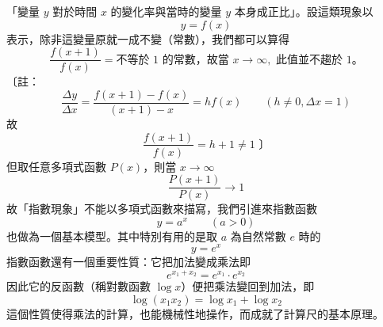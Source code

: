 「變量 $y$ 對於時間 $x$ 的變化率與當時的變量 $y$ 本身成正比」。設這類現象以
\[ y = f(x) \]
表示，除非這變量原就一成不變（常數），我們都可以算得
\[ \dfrac{f(x+1)}{f(x)} = \text{不等於 1 的常數，故當 } x \longrightarrow \infty, \text{ 此值並不趨於 1。} \]
〔註：
\[ \dfrac{\Delta y}{\Delta x} = \dfrac{f(x+1)-f(x)}{(x+1)-x} = h f(x) \qquad (h \ne 0, \Delta x = 1) \]
故
\[ \dfrac{f(x+1)}{f(x)} = h+1 \ne 1 \text{ 〕} \]
但取任意多項式函數 $P(x)$，則當 $x \longrightarrow \infty$
\[ \dfrac{P(x+1)}{P(x)} \longrightarrow 1 \]
故「指數現象」不能以多項式函數來描寫，我們引進來指數函數
\begin{equation}
y = a^x \qquad (a > 0) \label{eq:b6-3-11}
\end{equation}
也做為一個基本模型。其中特別有用的是取 $a$ 為自然常數 $e$ 時的
\begin{equation}
y = e^x \label{eq:b6-3-12}
\end{equation}
指數函數還有一個重要性質：它把加法變成乘法即
\begin{equation}
e^{x_1+x_2} = e^{x_1} \cdot e^{x_2} \label{eq:b6-3-13}
\end{equation}
因此它的反函數（稱對數函數 $\log x$）便把乘法變回到加法，即
\begin{equation}
\log(x_1 x_2) = \log x_1 + \log x_2 \label{eq:b6-3-14}
\end{equation}
這個性質使得乘法的計算，也能機械性地操作，而成就了計算尺的基本原理。

\newpage

